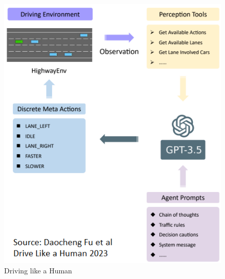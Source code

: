 \begin{spacing}{1.5}
\begin{sloppypar}
\begin{figure}[h]
\begin{center}
\includegraphics[scale=1.5]{2/DriveLikeHuman_1.png}
\caption{Driving like a Human}
\label{fig:driving}
\end{center}
\end{figure}
\end{sloppypar}
 \end{spacing}

 
